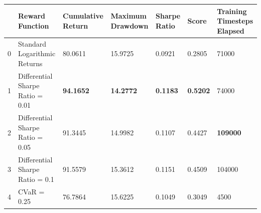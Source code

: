 \begin{tabular}{lllllll}
\toprule
 & Reward Function & Cumulative Return & Maximum Drawdown & Sharpe Ratio & Score & Training Timesteps Elapsed \\
\midrule
0 & Standard Logarithmic Returns & 80.0611 & 15.9725 & 0.0921 & 0.2805 & 71000 \\
1 & Differential Sharpe Ratio = 0.01 & \textbf{94.1652} & \textbf{14.2772} & \textbf{0.1183} & \textbf{0.5202} & 74000 \\
2 & Differential Sharpe Ratio = 0.05 & 91.3445 & 14.9982 & 0.1107 & 0.4427 & \textbf{109000} \\
3 & Differential Sharpe Ratio = 0.1 & 91.5579 & 15.3612 & 0.1151 & 0.4509 & 104000 \\
4 & CVaR = 0.25 & 76.7864 & 15.6225 & 0.1049 & 0.3049 & 4500 \\
\bottomrule
\end{tabular}
